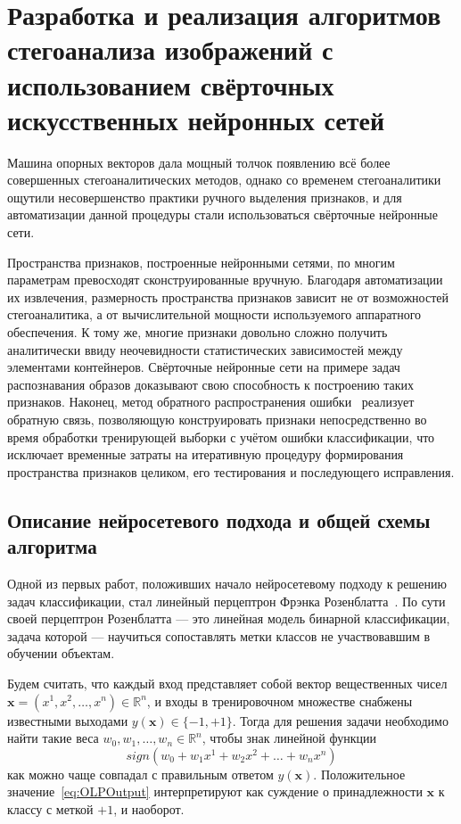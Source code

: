 
\section{Разработка и реализация алгоритмов стегоанализа изображений с использованием свёрточных искусственных нейронных сетей}

Машина опорных векторов дала мощный толчок появлению всё более совершенных стегоаналитических методов, однако со временем стегоаналитики ощутили несовершенство практики ручного выделения признаков, и для автоматизации данной процедуры стали использоваться свёрточные нейронные сети.

Пространства признаков, построенные нейронными сетями, по многим параметрам превосходят сконструированные вручную. Благодаря автоматизации их извлечения, размерность пространства признаков зависит не от возможностей стегоаналитика, а от вычислительной мощности используемого аппаратного обеспечения. К тому же, многие признаки довольно сложно получить аналитически ввиду неочевидности статистических зависимостей между элементами контейнеров. Свёрточные нейронные сети на примере задач распознавания образов доказывают свою способность к построению таких признаков. Наконец, метод обратного распространения ошибки~\cite{BackProp} реализует обратную связь, позволяющую конструировать признаки непосредственно во время обработки тренирующей выборки с учётом ошибки классификации, что исключает временные затраты на итеративную процедуру формирования пространства признаков целиком, его тестирования и последующего исправления.

\subsection{Описание нейросетевого подхода и общей схемы алгоритма}

Одной из первых работ, положивших начало нейросетевому подходу к решению задач классификации, стал линейный перцептрон Фрэнка Розенблатта~\cite{Rosenblatt1, Rosenblatt2}. По сути своей перцептрон Розенблатта --- это линейная модель бинарной классификации, задача которой --- научиться сопоставлять метки классов не участвовавшим в обучении объектам.

Будем считать, что каждый вход представляет собой вектор вещественных чисел $ \boldsymbol{x} = (x^1, x^2, \ldots, x^n) \in \mathbb{R}^n $, и входы в тренировочном множестве снабжены известными выходами $ y(\boldsymbol{x}) \in \{-1, +1\} $. Тогда для решения задачи необходимо найти такие веса $ w_0, w_1, \ldots, w_n \in \mathbb{R}^n $, чтобы знак линейной функции
\begin{equation}
sign(w_0 + w_1x^1 + w_2x^2 + \ldots + w_nx^n)
\label{eq:OLPOutput}
\end{equation}
как можно чаще совпадал с правильным ответом $ y(\boldsymbol{x}) $. Положительное значение~\ref{eq:OLPOutput} интерпретируют как суждение о принадлежности $ \boldsymbol{x} $ к классу с меткой $ +1 $, и наоборот.

